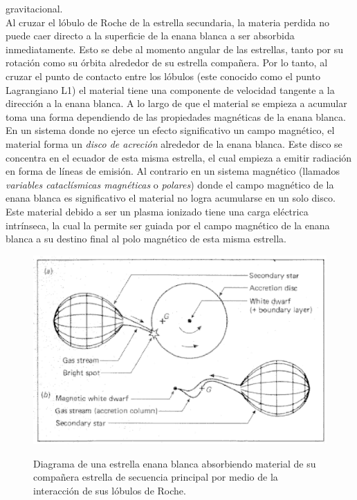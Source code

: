 gravitacional. \\\newline
Al cruzar el lóbulo de Roche de la estrella secundaria, la materia perdida no
puede caer directo a la superficie de la enana blanca a ser absorbida
inmediatamente. Esto se debe al momento angular de las estrellas, tanto por su
rotación como su órbita alrededor de su estrella compañera. Por lo tanto, al
cruzar el punto de contacto entre los lóbulos (este conocido como el punto
Lagrangiano L1) el material tiene una componente de velocidad tangente a la
dirección a la enana blanca. A lo largo de que el material se empieza a acumular
toma una forma dependiendo de las propiedades magnéticas de la enana blanca. En
un sistema donde no ejerce un efecto significativo un campo magnético, el
material forma un \textit{disco de acreción} alrededor de la enana blanca. Este
disco se concentra en el ecuador de esta misma estrella, el cual empieza a
emitir radiación en forma de líneas de emisión. Al contrario en un sistema
magnético (llamados \textit{variables cataclísmicas magnéticas} o
\textit{polares}) donde el campo magnético de la enana blanca es significativo
el material no logra acumularse en un solo disco. Este material debido a ser un
plasma ionizado tiene una carga eléctrica intrínseca, la cual la permite ser
guiada por el campo magnético de la enana blanca a su destino final al polo
magnético de esta misma estrella. \\\newline
\begin{figure}
	\centering
	\includegraphics[scale=0.4]{Introduccion/Figures/Figura Acrecion_SmithReview.png}
	\caption{Diagrama de una estrella enana blanca absorbiendo material de su
	compañera estrella de secuencia principal por medio de la interacción de sus
	lóbulos de Roche.} \cite*{smithReview}
	\label{acrecionSmithReview}
\end{figure}

